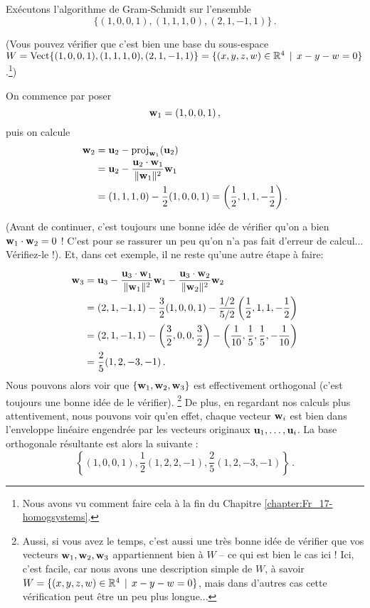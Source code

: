 \begin{myexample}\label{example:GS} Exécutons l'algorithme de Gram-Schmidt sur l'ensemble 
$$\{ (1,0,0,1), (1,1,1,0), (2,1,-1,1)\}\,.
$$

(Vous pouvez vérifier que c'est bien une base du sous-espace $W=\operatorname{ Vect} \normalsize\{ (1,0,0,1), (1,1,1,0), (2,1,-1,1)\normalsize\}=\{(x,y,z,w)\in \mathbb{R}^4\, \mid \, x - y - w = 0\}$.\footnote{Nous avons vu comment faire cela à la fin du Chapitre \ref{chapter:Fr_17-homogsystems}.})


On commence par poser
$$
\mathbf{w}_1 = (1,0,0,1)\,,
$$
puis on calcule
\begin{align*}
\mathbf{w}_2 &= \mathbf{u}_2 - \operatorname{proj}_{\mathbf{w}_1}(\mathbf{u}_2)\\
&= \mathbf{u}_2 - \frac{\mathbf{u}_2\cdot \mathbf{w}_1}{\|\mathbf{w}_1\|^2}\mathbf{w}_1 \\
&= (1,1,1,0) - \frac{1}{2}(1,0,0,1) = \left(\frac12,1,1,-\frac12\right). 
\end{align*}

(Avant de continuer, c'est toujours une bonne idée de vérifier qu'on a bien $\mathbf{w}_1\cdot \mathbf{w}_2 =0$ ! C'est pour se rassurer un peu qu'on n'a pas fait d'erreur de calcul... Vérifiez-le !).
Et, dans cet exemple, il ne reste qu'une autre étape \`a faire:

\begin{align*}
\mathbf{w}_3 &= \mathbf{u}_3 - \frac{\mathbf{u}_3\cdot \mathbf{w}_1}{\|\mathbf{w}_1\|^2}\mathbf{w}_1 - \frac{\mathbf{u}_3\cdot \mathbf{w}_2}{\|\mathbf{w}_2\|^2}\mathbf{w}_2\\
&= (2,1,-1,1) - \frac{3}{2} (1,0,0,1) - \frac{1/2}{5/2}
\left(\frac12,1,1,-\frac12\right) \\
&= (2,1,-1,1) -\left(\frac32,0,0,\frac32\right) - \left(\frac1{10}, \frac15
 , \frac15, -\frac1{10}\right)\\
&= \frac25(1, 2 , -3 , -1)\,.
\end{align*}
Nous pouvons alors voir que $\{\mathbf{w}_1,\mathbf{w}_2,\mathbf{w}_3\}$ est effectivement orthogonal (c'est toujours une bonne idée de le vérifier). \footnote{Aussi, si vous avez le temps, c'est aussi une très bonne idée de vérifier que vos vecteurs $\mathbf{w}_1,\mathbf{w}_2,\mathbf{w}_3$ appartiennent bien à $W$ -- ce qui est bien le cas ici ! Ici, c'est facile, car nous avons une description simple de $W$, à savoir  $W=\{(x,y,z,w)\in \mathbb{R}^4\, \mid \, x - y - w = 0\}$, mais dans d'autres cas cette vérification peut être un peu plus longue...}  De plus,
en regardant nos calculs plus attentivement, nous pouvons voir qu'en effet,
chaque vecteur $\mathbf{w}_i$ est bien dans l'enveloppe lin\'eaire engendr\'ee par les vecteurs originaux $\mathbf{u}_1, \dots, \mathbf{u}_i$. 
La base orthogonale résultante est alors la suivante :
$$
\left\{ (1,0,0,1), \frac12(1,2,2,-1), \frac25(1,2,-3,-1)\right\}\,.
$$  


\end{myexample}
